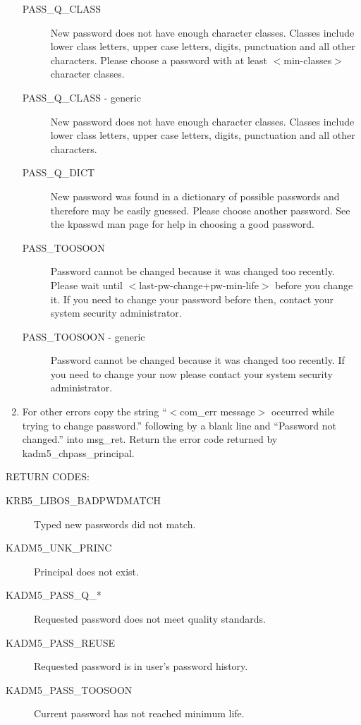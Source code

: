 \begin{enumerate}
\begin{description}
\item[PASS_Q_CLASS]
New password does not have enough character classes. Classes include
lower class letters, upper case letters, digits, punctuation and all
other characters.  Please choose a password with at least
$<$min-classes$>$ character classes.

\item[PASS_Q_CLASS - generic]
New password does not have enough character classes. Classes include
lower class letters, upper case letters, digits, punctuation and all
other characters.

\item[PASS_Q_DICT]
New password was found in a dictionary of possible passwords and
therefore may be easily guessed.  Please choose another password. See
the kpasswd man page for help in choosing a good password.

\item[PASS_TOOSOON]
Password cannot be changed because it was changed too recently. Please
wait until $<$last-pw-change+pw-min-life$>$ before you change it. If you
need to change your password before then, contact your system
security administrator.

\item[PASS_TOOSOON - generic]
Password cannot be changed because it was changed too recently. If you
need to change your now please contact your system security
administrator.
\end{description}

\item For other errors copy the string ``$<$com_err message$>$
occurred while trying to change password.'' following by a blank line
and ``Password not changed.'' into msg_ret. Return the error code
returned by kadm5_chpass_principal.
\end{enumerate}


RETURN CODES:

\begin{description}
\item[KRB5_LIBOS_BADPWDMATCH] Typed new passwords did not match.
\item[KADM5_UNK_PRINC] Principal does not exist.
\item[KADM5_PASS_Q_*] Requested password does not meet quality
standards.
\item[KADM5_PASS_REUSE] Requested password is in user's
password history.
\item[KADM5_PASS_TOOSOON] Current password has not reached minimum
life.
\end{description}

